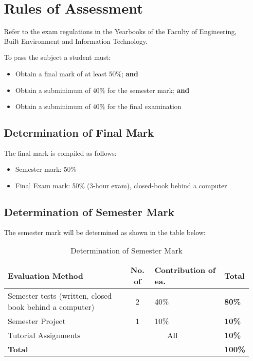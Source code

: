 \section{Rules of Assessment}
    Refer to the exam regulations in the Yearbooks of the Faculty of Engineering,
    Built Environment and Information Technology.

    To pass the subject a student must:
    \begin{itemize}
        \item Obtain a final mark of at least 50\%; {\bf and}
        \item Obtain a subminimum of 40\% for the semester mark; {\bf and}
        \item Obtain a subminimum of 40\% for the final examination
    \end{itemize}

    \subsection{Determination of Final Mark}
        The final mark is compiled as follows:
        \begin{itemize}
            \item Semester mark: 50\%
            \item Final Exam mark: 50\% (3-hour exam), closed-book behind a computer
        \end{itemize}

    \subsection{Determination of Semester Mark}
        The semester mark will be determined as shown in the table below:
        \begin{table}[!h]
            \begin{center}
             \begin{tabular}{|p{6cm}|c|l|l|}
               \hline
               {\bf Evaluation Method} & {\bf No. of} &
               {\bf Contribution of ea.} & {\bf Total} \\
               \hline
               Semester tests (written, closed book behind a computer)
               & 2 & 40\% & {\bf 80\%} \\ \hline
               Semester Project
               & 1 & 10\% & {\bf 10\%} \\ \hline
               Tutorial Assignments
               & \multicolumn{2}{|c|}{All} & {\bf 10\%} \\
               \hline
               \multicolumn{3}{|l|}{{\bf Total}} & {\bf 100\%} \\
               \hline
             \end{tabular}
             \caption{Determination of Semester Mark}
            \end{center}
        \end{table}

